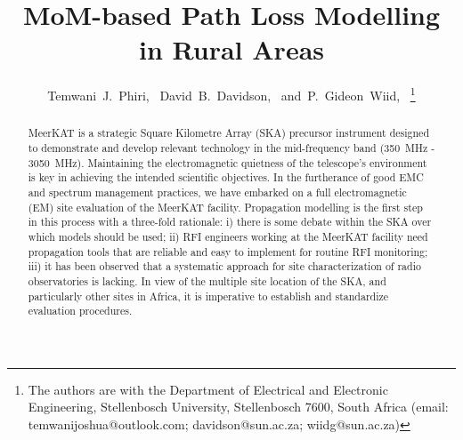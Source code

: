 \documentclass[10pt,journal,twoside]{IEEEtran}
\begin{document}
\title{MoM-based Path Loss Modelling in Rural Areas}

\author{Temwani~J.~Phiri,~
        David~B.~Davidson,~
        and~P.~Gideon~Wiid,~%
%
\thanks{The authors are with the Department of Electrical
and Electronic Engineering, Stellenbosch University, Stellenbosch 7600, South
Africa (email: temwanijoshua@outlook.com; davidson@sun.ac.za; wiidg@sun.ac.za)}}%
%
%
\maketitle
%
\begin{abstract}
MeerKAT is a strategic Square Kilometre Array (SKA) precursor instrument designed to demonstrate and develop relevant technology in the mid-frequency band (\SI{350}{MHz} - \SI{3050}{MHz}). Maintaining the electromagnetic quietness of the telescope's environment is key in achieving the intended scientific objectives. In the furtherance of good EMC and spectrum management practices, we have embarked on a full electromagnetic (EM) site evaluation of the MeerKAT facility. Propagation modelling is the first step in this process with a three-fold rationale: i) there is some debate within the SKA over which models should be used; ii) RFI engineers working at the MeerKAT facility need propagation tools that are reliable and easy to implement for routine RFI monitoring; iii) it has been observed that a systematic approach for site characterization of radio observatories is lacking. In view of the multiple site location of the SKA, and particularly other sites in Africa, it is imperative to establish and standardize evaluation procedures.
\end{abstract}
%
%
\end{document}
